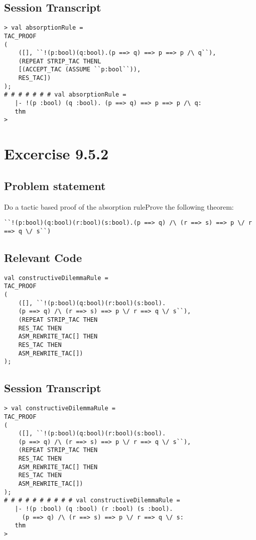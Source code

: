\documentclass{report}
\begin{document}
\section{Session Transcript}
\label{trans-9-5-1}
\begin{session}
  \begin{scriptsize}
\begin{verbatim}
> val absorptionRule =
TAC_PROOF
(
	([], ``!(p:bool)(q:bool).(p ==> q) ==> p ==> p /\ q``),
	(REPEAT STRIP_TAC THENL
	[(ACCEPT_TAC (ASSUME ``p:bool``)),
	RES_TAC])
);
# # # # # # # val absorptionRule =
   |- !(p :bool) (q :bool). (p ==> q) ==> p ==> p /\ q:
   thm
> 
\end{verbatim}
  \end{scriptsize}
\end{session}

\chapter{Excercise 9.5.2}
\label{cha:9-5-2}

\section{Problem statement}
\label{problem-statement-9-5-2}
Do a tactic based proof of the absorption ruleProve the following theorem:
\begin{lstlisting}[frame=tblr]
``!(p:bool)(q:bool)(r:bool)(s:bool).(p ==> q) /\ (r ==> s) ==> p \/ r ==> q \/ s``)
\end{lstlisting}

\section{Relevant Code}
\label{rel-code-9-5-2}
\begin{lstlisting}[frame=TBlr]
val constructiveDilemmaRule =
TAC_PROOF
(
	([], ``!(p:bool)(q:bool)(r:bool)(s:bool).
	(p ==> q) /\ (r ==> s) ==> p \/ r ==> q \/ s``),
	(REPEAT STRIP_TAC THEN
	RES_TAC THEN
	ASM_REWRITE_TAC[] THEN
	RES_TAC THEN
	ASM_REWRITE_TAC[])
);
\end{lstlisting}

\section{Session Transcript}
\label{trans-9-5-2}
\begin{session}
  \begin{scriptsize}
\begin{verbatim}
> val constructiveDilemmaRule =
TAC_PROOF
(
	([], ``!(p:bool)(q:bool)(r:bool)(s:bool).
	(p ==> q) /\ (r ==> s) ==> p \/ r ==> q \/ s``),
	(REPEAT STRIP_TAC THEN
	RES_TAC THEN
	ASM_REWRITE_TAC[] THEN
	RES_TAC THEN
	ASM_REWRITE_TAC[])
);
# # # # # # # # # # val constructiveDilemmaRule =
   |- !(p :bool) (q :bool) (r :bool) (s :bool).
     (p ==> q) /\ (r ==> s) ==> p \/ r ==> q \/ s:
   thm
> 
\end{verbatim}
  \end{scriptsize}
\end{session}
\end{document}
